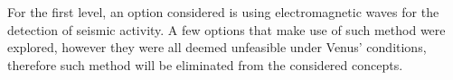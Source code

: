 






For the first level, an option considered is using electromagnetic waves for the detection of seismic activity. A few options that make use of such method were explored, however they were all deemed unfeasible under Venus' conditions, therefore such method will be eliminated from the considered concepts. 

